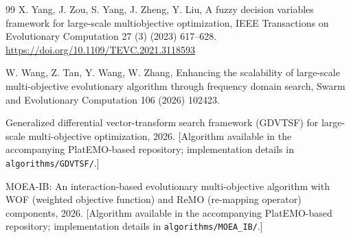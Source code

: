 \documentclass[preprint,12pt]{elsarticle}
\begin{document}
\begin{thebibliography}{99}
X. Yang, J. Zou, S. Yang, J. Zheng, Y. Liu, A fuzzy decision variables
framework for large-scale multiobjective optimization, IEEE Transactions on
Evolutionary Computation 27 (3) (2023) 617--628.
\url{https://doi.org/10.1109/TEVC.2021.3118593}

W. Wang, Z. Tan, Y. Wang, W. Zhang, Enhancing the scalability of
large-scale multi-objective evolutionary algorithm through frequency domain
search, Swarm and Evolutionary Computation 106 (2026) 102423.

Generalized differential vector-transform search framework (GDVTSF) for
large-scale multi-objective optimization, 2026. [Algorithm available in the
accompanying PlatEMO-based repository; implementation details in
\texttt{algorithms/GDVTSF/}.]

MOEA-IB: An interaction-based evolutionary multi-objective algorithm with
WOF (weighted objective function) and ReMO (re-mapping operator) components,
2026. [Algorithm available in the accompanying PlatEMO-based repository;
implementation details in \texttt{algorithms/MOEA\_IB/}.]

\end{thebibliography}
\end{document}
